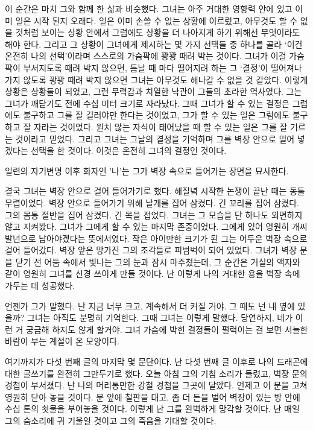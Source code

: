 이 순간은 마치 그와 함께 한 삶과 비슷했다. 그녀는 아주 거대한 영향력 안에 있고 이미 일은 시작 된지 오래다. 일은 이미 손쓸 수 없는 상황에 이르렀고, 아무것도 할 수 없을 것처럼 보이는 상황 안에서 그럼에도 상황을 더 나아지게 하기 위해선 무엇이라도 해야 한다. 그리고 그 상황이 그녀에게 제시하는 몇 가지 선택들 중 하나를 골라 `이건 온전히 나의 선택'이라며 스스로의 가슴팍에 꽝꽝 때려 박는 것이다. 그녀가 이걸 가슴팍이 부서지도록 때려 박지 않으면, 틈날 때 마다 떨어지려 하는 그 `결정'이 떨어져나가지 않도록 꽝꽝 때려 박지 않으면 그녀는 아무것도 해나갈 수 없을 것 같았다. 이렇게 상황은 상황들이 되었고, 그런 무력감과 치열한 낙관이 그들의 초라한 역사였다. 그는 그녀가 깨닫기도 전에 수십 미터 크기로 자라났다. 그때 그녀가 할 수 있는 결정은 그럼에도 불구하고 그를 잘 길러야만 한다는 것이었고, 그가 할 수 있는 일은 그럼에도 불구하고 잘 자라는 것이었다. 원치 않는 자식이 태어났을 때 할 수 있는 일은 그를 잘 기르는 것이라고 믿었다. 그리고 그녀는 그날의 결정을 기억하며 그를 벽장 안으로 밀어 넣겠다는 선택을 한 것이다. 이것은 온전히 그녀의 결정인 것이다.



일련의 자기변명 이후 화자인 '나'는 그가 벽장 속으로 들어가는 장면을 묘사한다.



결국 그녀는 벽장 안으로 걸어 들어가기로 했다. 해질녘 시작한 논쟁이 끝난 때는 동틀 무렵이었다. 벽장 안으로 들어가기 위해 날개를 집어 삼켰다. 긴 꼬리를 집어 삼켰다. 그의 몸통 절반을 집어 삼켰다. 긴 목을 접었다. 그녀는 그 모습을 단 하나도 외면하지 않고 지켜봤다. 그녀가 그에게 할 수 있는 마지막 존중이었다. 그에게 있어 영원히 개씨발년으로 남아야겠다는 뜻에서였다. 작은 아이만한 크기가 된 그는 어두운 벽장 속으로 걸어 들어갔다. 벽장 앞은 망가진 그의 조각들로 피범벅이 되어 있었다. 그녀가 벽장 문을 닫기 전 어둠 속에서 빛나는 그의 눈과 잠시 마주쳤는데, 그 순간은 거실의 액자와 같이 영원히 그녀를 신경 쓰이게 만들 것이다. 난 이렇게 나의 거대한 용을 벽장 속에 가두는 데 성공했다.



언젠가 그가 말했다. 난 지금 너무 크고, 계속해서 더 커질 거야. 그 때도 넌 내 옆에 있을까? 그녀는 아직도 분명히 기억한다. 그때 그녀는 이렇게 말했다. 당연하지, 네가 이런 거 궁금해 하지도 않게 할거야. 그녀 가슴에 박힌 결정들이 펄럭이는 걸 보면 서늘한 바람이 부는 계절이 온 모양이다.



여기까지가 다섯 번째 글의 마지막 몇 문단이다. 난 다섯 번째 글 이후로 나의 드래곤에 대한 글쓰기를 완전히 그만두기로 했다. 오늘 아침 그의 기침 소리가 들렸고, 벽장 문의 경첩이 부서졌다. 난 나의 머리통만한 강철 경첩을 그곳에 달았다. 언제고 이 문을 고쳐 영원히 닫아 놓을 것이다. 문 앞에 철판을 대고, 좀 더 돈을 벌어 벽장이 있는 방 안에 수십 톤의 쇳물을 부어놓을 것이다. 이렇게 난 그를 완벽하게 망각할 것이다. 난 매일 그의 숨소리에 귀 기울일 것이고 그의 죽음을 기대할 것이다.

